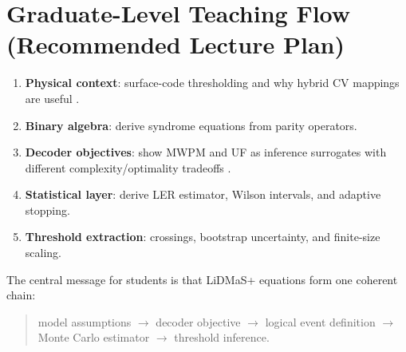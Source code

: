 \documentclass[11pt]{article}
\begin{document}
\section{Graduate-Level Teaching Flow (Recommended Lecture Plan)}
\begin{enumerate}[label=\arabic*.]
  \item \textbf{Physical context}: surface-code thresholding and why hybrid CV mappings are useful \cite{surfacecode1998,gkp2001,tzitrin2021static,sabo2024weightreduced}.
  \item \textbf{Binary algebra}: derive syndrome equations from parity operators.
  \item \textbf{Decoder objectives}: show MWPM and UF as inference surrogates with different complexity/optimality tradeoffs \cite{pymatching2021,unionfind2017}.
  \item \textbf{Statistical layer}: derive LER estimator, Wilson intervals, and adaptive stopping.
  \item \textbf{Threshold extraction}: crossings, bootstrap uncertainty, and finite-size scaling.
\end{enumerate}

The central message for students is that LiDMaS+ equations form one coherent chain:
\begin{quote}
model assumptions $\rightarrow$ decoder objective $\rightarrow$ logical event definition $\rightarrow$ Monte Carlo estimator $\rightarrow$ threshold inference.
\end{quote}



\end{document}
